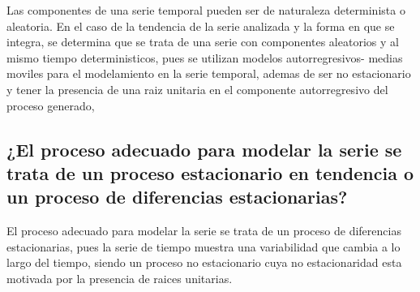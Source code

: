 \documentclass[
]{article}
\begin{document}
Las componentes de una serie temporal pueden ser de naturaleza
determinista o aleatoria. En el caso de la tendencia de la serie
analizada y la forma en que se integra, se determina que se trata de una
serie con componentes aleatorios y al mismo tiempo deterministicos, pues
se utilizan modelos autorregresivos- medias moviles para el modelamiento
en la serie temporal, ademas de ser no estacionario y tener la presencia
de una raiz unitaria en el componente autorregresivo del proceso
generado,

\hypertarget{el-proceso-adecuado-para-modelar-la-serie-se-trata-de-un-proceso-estacionario-en-tendencia-o-un-proceso-de-diferencias-estacionarias}{%
\subsection{¿El proceso adecuado para modelar la serie se trata de un
proceso estacionario en tendencia o un proceso de diferencias
estacionarias?}\label{el-proceso-adecuado-para-modelar-la-serie-se-trata-de-un-proceso-estacionario-en-tendencia-o-un-proceso-de-diferencias-estacionarias}}

El proceso adecuado para modelar la serie se trata de un proceso de
diferencias estacionarias, pues la serie de tiempo muestra una
variabilidad que cambia a lo largo del tiempo, siendo un proceso no
estacionario cuya no estacionaridad esta motivada por la presencia de
raices unitarias.
\end{document}
